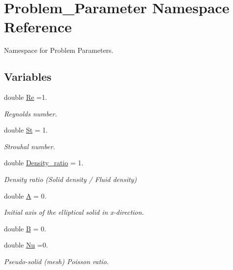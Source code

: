 \hypertarget{namespaceProblem__Parameter}{}\section{Problem\+\_\+\+Parameter Namespace Reference}
\label{namespaceProblem__Parameter}


Namespace for Problem Parameters.  


\subsection*{Variables}
\begin{DoxyCompactItemize}
\item 
double \hyperlink{namespaceProblem__Parameter_acc656299287d4d9a8374c2c501750b4f}{Re} =1.
\begin{DoxyCompactList}\small\item\em Reynolds number. \end{DoxyCompactList}\item 
double \hyperlink{namespaceProblem__Parameter_a8d9b76e390569bac0095bd0952281a30}{St} = 1.
\begin{DoxyCompactList}\small\item\em Strouhal number. \end{DoxyCompactList}\item 
double \hyperlink{namespaceProblem__Parameter_a7fcb9a415485247d626190923235be2a}{Density\+\_\+ratio} = 1.
\begin{DoxyCompactList}\small\item\em Density ratio (Solid density / Fluid density) \end{DoxyCompactList}\item 
double \hyperlink{namespaceProblem__Parameter_a23071148de0fea3597c2a7eb848320b6}{A} = 0.
\begin{DoxyCompactList}\small\item\em Initial axis of the elliptical solid in x-\/direction. \end{DoxyCompactList}\item 
double \hyperlink{namespaceProblem__Parameter_ac2362a46222574a21338a113e2bee27e}{B} = 0.
\item 
double \hyperlink{namespaceProblem__Parameter_abec2e733c8f2d3c18ebc702b3f80cc17}{Nu} =0.
\begin{DoxyCompactList}\small\item\em Pseudo-\/solid (mesh) Poisson ratio. \end{DoxyCompactList}\item 

\end{DoxyCompactItemize}
